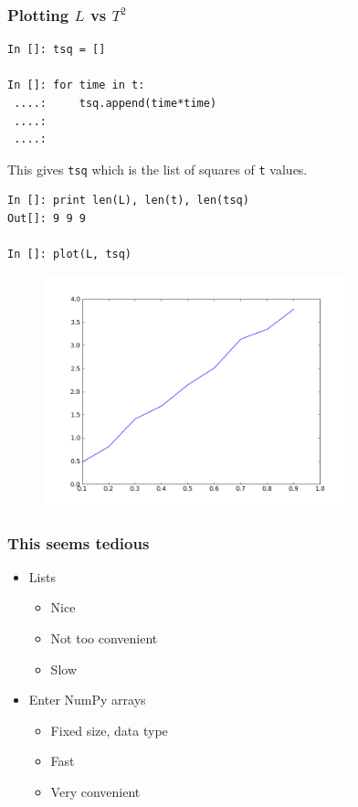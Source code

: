 \documentclass[14pt,compress]{beamer}
\newcounter{time}
\newcommand{\typ}[1]{\lstinline{#1}}
\begin{document}
\begin{frame}[fragile]
\frametitle{Plotting $L$ vs $T^2$}
\begin{lstlisting}
In []: tsq = []

In []: for time in t:
 ....:     tsq.append(time*time)
 ....:
 ....:

\end{lstlisting}
This gives \typ{tsq} which is the list of squares of \typ{t} values.
\begin{lstlisting}
In []: print len(L), len(t), len(tsq)
Out[]: 9 9 9

In []: plot(L, tsq)
\end{lstlisting}
\end{frame}

\begin{frame}[fragile]
\begin{figure}
\includegraphics[width=3.5in]{data/L-TSq-limited.png}
\end{figure}
\end{frame}


\begin{frame}[fragile]
\frametitle{This seems tedious}
\begin{itemize}
    \item Lists
\begin{itemize}
    \item Nice
    \item Not too convenient
    \item Slow
\end{itemize}
\item Enter NumPy arrays
    \begin{itemize}
        \item Fixed size, data type
        \item Fast
        \item Very convenient
    \end{itemize}
\end{itemize}
\end{frame}
\end{document}

